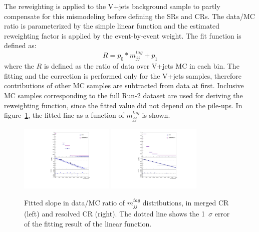 The reweighting is applied to the V+jets background sample to partly compensate for this mismodeling before defining the SRs and CRs. 
The data/MC ratio is parameterized by the simple linear function and the estimated reweighting factor is applied by the event-by-event weight. 
The fit function is defined as:
\begin{equation}
\label{eqn:reweight}
R=p_{0} * m_{jj}^{tag}+p_{1}
\end{equation}
where the $R$ is defined as the ratio of data over V+jets MC in each bin.
The fitting and the correction is performed only for the V+jets samples, therefore contributions of other MC samples are subtracted from data at first. 
Inclusive MC samples corresponding to the full Run-2 dataset are used for deriving the reweighting function, since the fitted value did not depend on the pile-ups.
In figure~\ref{fig:LinearFit}, the fitted line as a function of $m^{tag}_{jj}$ is shown. 

\begin{figure}[ht]
    \centering
    \includegraphics[width=0.40\textwidth]{figures/2lep/reweighting/MTagMerJets_0ptag1pfat0pjet_0ptv_CRVjet_finerbin}
    \includegraphics[width=0.40\textwidth]{figures/2lep/reweighting/MTagResJets_0ptag2pjet_0ptv_CRVjet_Fid_finerbin}
    \caption{ Fitted slope in data/MC ratio of $m^{tag}_{jj}$ distributions, in merged CR (left) and resolved CR (right). The dotted line shows the 1~$\sigma$ error of the fitting result of the linear function. }
    \label{fig:LinearFit}
\end{figure}

